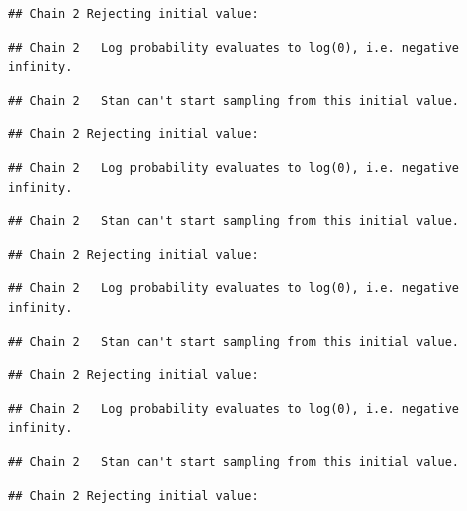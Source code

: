 \documentclass[
]{article}
\begin{document}
\begin{verbatim}
## Chain 2 Rejecting initial value:
\end{verbatim}

\begin{verbatim}
## Chain 2   Log probability evaluates to log(0), i.e. negative infinity.
\end{verbatim}

\begin{verbatim}
## Chain 2   Stan can't start sampling from this initial value.
\end{verbatim}

\begin{verbatim}
## Chain 2 Rejecting initial value:
\end{verbatim}

\begin{verbatim}
## Chain 2   Log probability evaluates to log(0), i.e. negative infinity.
\end{verbatim}

\begin{verbatim}
## Chain 2   Stan can't start sampling from this initial value.
\end{verbatim}

\begin{verbatim}
## Chain 2 Rejecting initial value:
\end{verbatim}

\begin{verbatim}
## Chain 2   Log probability evaluates to log(0), i.e. negative infinity.
\end{verbatim}

\begin{verbatim}
## Chain 2   Stan can't start sampling from this initial value.
\end{verbatim}

\begin{verbatim}
## Chain 2 Rejecting initial value:
\end{verbatim}

\begin{verbatim}
## Chain 2   Log probability evaluates to log(0), i.e. negative infinity.
\end{verbatim}

\begin{verbatim}
## Chain 2   Stan can't start sampling from this initial value.
\end{verbatim}

\begin{verbatim}
## Chain 2 Rejecting initial value:
\end{verbatim}
\end{document}

